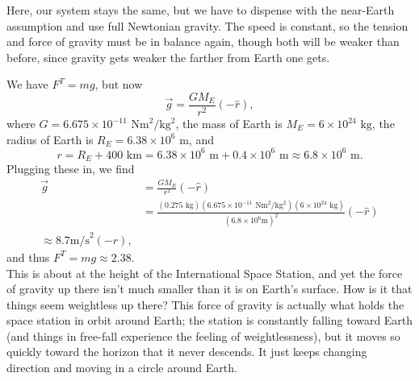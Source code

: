 \documentclass[]{article}
\begin{document}
\begin{TeacherMargin}
Here, our system stays the same, but we have to dispense with the near-Earth assumption and use full Newtonian gravity. The speed is constant, so the tension and force of gravity must be in balance again, though both will be weaker than before, since gravity gets weaker the farther from Earth one gets.
\begin{center}
\end{center}
We have $F^{T} = mg$, but now
\[
\vec{g} = \frac{GM_{E}}{r^{2}}(-\hat{r}),
\]
where $G = 6.675\times10^{-11}\text{ Nm}^{2}/\text{kg}^{2}$, the mass of Earth is $M_{E} = 6\times10^{24}\text{ kg}$, the radius of Earth is $R_{E} = 6.38\times10^{6}\text{ m}$, and
\[
r = R_{E} + 400\text{ km} = 6.38\times10^{6}\text{ m} + 0.4\times10^{6}\text{ m} \approx 6.8\times10^{6}\text{ m}.
\]
Plugging these in, we find
\begin{align*}
	\vec{g} & = \frac{GM_{E}}{r^{2}}(-\hat{r}) \\
	& = \frac{(0.275\text{ kg})(6.675\times10^{-11}\text{ Nm}^{2}/\text{kg}^{2})(6\times10^{24}\text{ kg})}{(6.8\times10^{6}\text{m})^{2}}(-\hat{r}) \\
	\approx 8.7\text{m/s}^{2}(-\hat{r}),
\end{align*}
and thus $F^{T} = mg \approx 2.38$. \\

\noindent This is about at the height of the International Space Station, and yet the force of gravity up there isn't much smaller than it is on Earth's surface. How is it that things seem weightless up there? This force of gravity is actually what holds the space station in orbit around Earth; the station is constantly falling toward Earth (and things in free-fall experience the feeling of weightlessness), but it moves so quickly toward the horizon that it never descends. It just keeps changing direction and moving in a circle around Earth.
\end{TeacherMargin}
\end{document}

